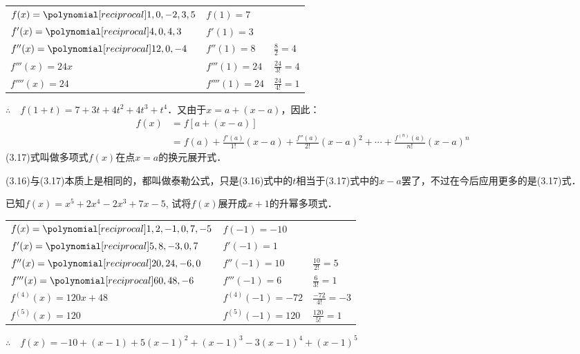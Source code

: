     \begin{solution}
\begin{center}
\begin{tabular}{lll}
$f(x)=\poly{1,0,-2,3,5}$  &  $f(1)=7$  \\
$f'(x)=\poly{4,0,4,3}$  &  $f'(1)=3$  \\
$f''(x)=\poly{12,0,-4}$  &  $f''(1)=8$& $\frac{8}{2}=4$  \\
$f'''(x)=24x$  &  $f'''(1)=24$ & $\frac{24}{3!}=4$\\
$f''''(x)=24$  &  $f''''(1)=24$ & $\frac{24}{4!}=1$\\
\end{tabular}    
\end{center}

$\therefore\quad f(1+t)=7+3t+4t^2+4t^3+t^4$．又由于$x=a+(x-a)$，因此：
\begin{equation}
    \begin{split}
    f(x)&=f[a+(x-a)]\\
    &=f(a)+\frac{f'(a)}{1!}(x-a)+\frac{f''(a)}{2!}(x-a)^2+\cdots+\frac{f^{(n)}(a)}{n!}(x-a)^n
\end{split}
\end{equation}
(3.17)式叫做多项式$f(x)$在点$x=a$的换元展开式．
    \end{solution}

(3.16)与(3.17)本质上是相同的，都叫做泰勒公式，只是(3.16)式中的$t$相当于(3.17)式中的$x-a$罢了，不过在今后应用更多的是(3.17)式．

 \begin{example}
    已知$f(x)=x^5+2x^4-2x^3+7x-5$, 试将$f(x)$展开成$x+1$的升幂多项式．
    \end{example}

    \begin{solution}    
\begin{center}
\begin{tabular}{lll}
$f(x)=\poly{1,2,-1,0,7,-5}$  &  $f(-1)=-10$  \\
$f'(x)=\poly{5,8,-3,0,7}$  &  $f'(-1)=1$  \\
$f''(x)=\poly{20,24,-6,0}$  &  $f''(-1)=10$& $\frac{10}{2!}=5$  \\
$f'''(x)=\poly{60,48,-6}$  &  $f'''(-1)=6$ & $\frac{6}{3!}=1$\\
$f^{(4)}(x)=120x+48$  &  $f^{(4)}(-1)=-72$ & $\frac{-72}{4!}=-3$\\
$f^{(5)}(x)=120$  &  $f^{(5)}(-1)=120$ & $\frac{120}{5!}=1$\\
\end{tabular}    
\end{center}
          
$\therefore\quad f(x)=-10+(x-1)+5(x-1)^2+(x-1)^3-3(x-1)^4+(x-1)^5$
    \end{solution}

